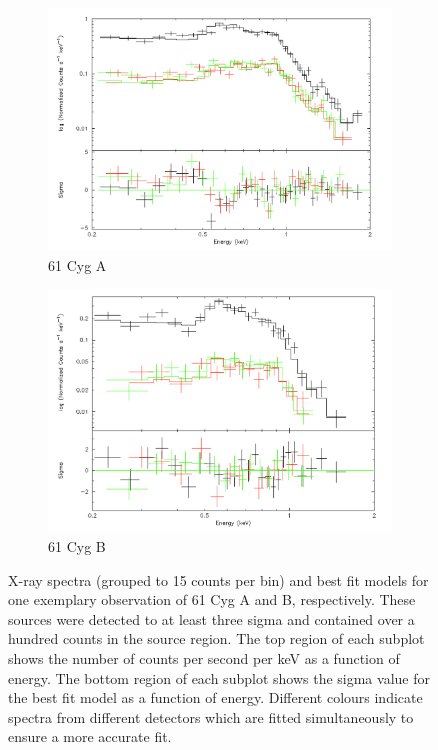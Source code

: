 \begin{appendices}
\begin{figure}
\begin{subfigure}{\textwidth}
	\centering
	\includegraphics[height = 0.25\paperheight,width=\textwidth]{Figures/3-Xray_age/spec_61cyga}
	\caption{61 Cyg A}
\end{subfigure}
\begin{subfigure}{\textwidth}
\centering
\includegraphics[height =        0.25\paperheight,width=\textwidth]{Figures/3-Xray_age/spec_61cygb}
\caption{61 Cyg B}
\end{subfigure}
\par\bigskip

\caption[X-ray spectra of 61 Cyg A and B]{X-ray spectra (grouped to 15 counts per bin) and best fit models for one exemplary observation of 61 Cyg A and B, respectively. These sources were detected to at least three sigma and contained over a hundred counts in the source region. The top region of each subplot shows the number of counts per second per keV as a function of energy. The bottom region of each subplot shows the sigma value for the best fit model as a function of energy. Different colours indicate spectra from different detectors which are fitted simultaneously to ensure a more accurate fit.}
\label{App_A_61Cyg}
\end{figure}


\end{appendices}

